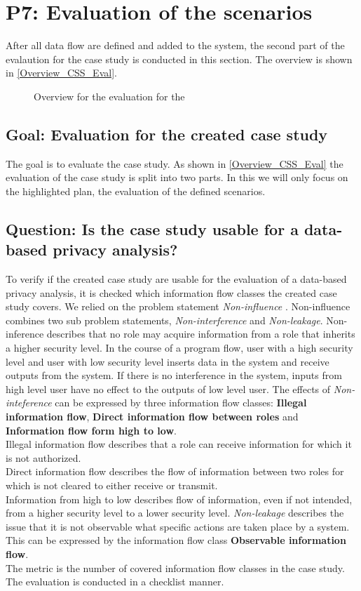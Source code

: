 \section{P7: Evaluation of the scenarios}
After all data flow are defined and added to the system, the second part of the evalaution for the case study is conducted in this section. The overview is shown in \autoref{Overview_CSS_Eval}. 
\begin{figure}
\caption{Overview for the evaluation for the }
\label{Overview_CSS_Eval}
\end{figure}
\subsection{Goal: Evaluation for the created case study}
The goal is to evaluate the case study. As shown in \autoref{Overview_CSS_Eval} the evaluation of the case study is split into two parts. In this we will only focus on the highlighted plan, the evaluation of the defined scenarios.
\subsection{Question: Is the case study usable for a data-based privacy analysis?}
To verify if the created case study are usable for the evaluation of a data-based privacy analysis, it is checked which information flow classes the created case study covers. We relied on the problem statement \textit{Non-influence} \cite{Noninfluence}. Non-influence combines two sub problem statements, \textit{Non-interference} and \textit{Non-leakage}. Non-inference describes that no role may acquire information from a role that inherits a higher security level. In the course of a program flow, user with a high security level and user with low security level inserts data in the system and receive outputs from the system. If there is no interference in the system, inputs from high level user have no effect to the outputs of low level user. The effects of \textit{Non-inteference} can be expressed by three information flow classes: \textbf{Illegal information flow}, \textbf{Direct information flow between roles} and \textbf{Information flow form high to low}. \\
Illegal information flow describes that a role can receive information for which it is not authorized.\\
Direct information flow describes the flow of information between two roles for which  is not cleared to either receive or transmit.\\
Information from high to low describes flow of information, even if not intended, from a higher security level to a lower security level.
\textit{Non-leakage} describes the issue that it is not observable what specific actions are taken place by a system. This can be expressed by the information flow class \textbf{Observable information flow}.\\
The metric is the number of covered information flow classes in the case study. The evaluation is conducted in a checklist manner. 

